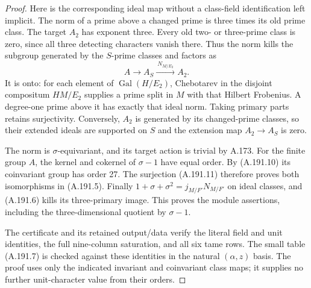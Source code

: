 \begin{proof}
Here is the corresponding ideal map without a class-field
identification left implicit.  The norm of a prime above a
changed prime is three times its old prime class.  The target
\(A_2\) has exponent three.  Every old two- or three-prime
class is zero, since all three detecting characters vanish
there.  Thus the norm kills the subgroup generated by the
\(S\)-prime classes and factors as
\[
                A\longrightarrow A_S
                       \xrightarrow{\ N_{M/E_2}\ } A_2.
\tag{A.191.11}
\]
It is onto: for each element of \(\operatorname{Gal}(H/E_2)\),
Chebotarev in the disjoint compositum \(HM/E_2\) supplies
a prime split in \(M\) with that Hilbert Frobenius.
A degree-one prime above it has exactly that ideal norm.
Taking primary parts retains surjectivity.  Conversely,
\(A_2\) is generated by its changed-prime classes, so their
extended ideals are supported on \(S\) and the extension
map \(A_2\to A_S\) is zero.

The norm is \(\sigma\)-equivariant, and its target action
is trivial by A.173.  For the finite group \(A\), the
kernel and cokernel of \(\sigma-1\) have equal order.
By (A.191.10) its coinvariant group has order 27.
The surjection (A.191.11) therefore proves both
isomorphisms in (A.191.5).  Finally
\(1+\sigma+\sigma^2=j_{M/F'}N_{M/F'}\) on ideal classes,
and (A.191.6) kills its three-primary image.  This proves
the module assertions, including the three-dimensional
quotient by \(\sigma-1\).

The certificate
and its retained output/data verify the literal field and unit
identities, the full nine-column saturation, and all six tame
rows.  The small table (A.191.7) is checked against these
identities in the natural \((\alpha,z)\) basis.  The proof
uses only the indicated invariant and coinvariant class maps;
it supplies no further unit-character value from their orders.
\end{proof}
